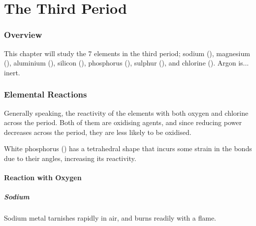 

\pagebreak
\part{The Third Period}

	\section{Overview}

		This chapter will study the 7 elements in the third period; sodium (), magnesium (), aluminium (\ch{\Al}), silicon (),
		phosphorus (), sulphur (), and chlorine (\ch{\Cl}). Argon is... inert.


	\section{Elemental Reactions}

		Generally speaking, the reactivity of the elements with both oxygen and chlorine  across the period. Both of them
		are oxidising agents, and since reducing power decreases across the period, they are less likely to be oxidised.

		White phosphorus () has a tetrahedral shape that incurs some strain in the bonds due to their angles, increasing its
		reactivity.


		\subsection{Reaction with Oxygen}

			\subsubsection{Sodium}

				Sodium metal tarnishes rapidly in air, and burns readily with a  flame.


